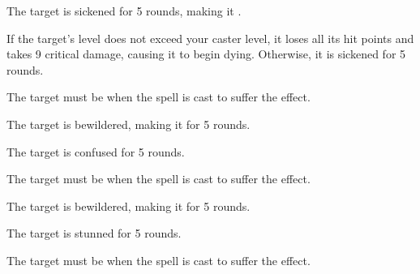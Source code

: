 \begin{spellhealthy}
    The target is sickened for 5 rounds, making it \vulnerable.
\end{spellhealthy}
\begin{spellblood}
    If the target's level does not exceed your caster level, it loses all its hit points and takes 9 critical damage, causing it to begin dying. Otherwise, it is sickened for 5 rounds.
\end{spellblood}
\begin{spellnotes}
    The target must be \bloodied when the spell is cast to suffer the \bloodied effect.
\end{spellnotes}

\begin{spellhealthy}
    The target is bewildered, making it \vulnerable for 5 rounds.
\end{spellhealthy}
\begin{spellblood}
    The target is confused for 5 rounds. \confusionexplanation
\end{spellblood}
\begin{spellnotes}
    The target must be \bloodied when the spell is cast to suffer the \bloodied effect.
\end{spellnotes}

\begin{spellhealthy}
    The target is bewildered, making it \vulnerable for 5 rounds.
\end{spellhealthy}
\begin{spellblood}
    The target is stunned for 5 rounds.
\end{spellblood}
\begin{spellnotes}
    The target must be \bloodied when the spell is cast to suffer the \bloodied effect.
\end{spellnotes}

